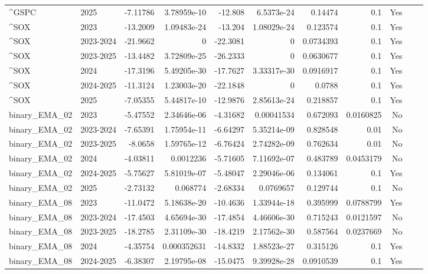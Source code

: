 \begin{longtable}{llrrrrrrrrl}
\textasciicircum{}GSPC & 2025 & -7.11786 & 3.78959e-10 & -12.808 & 6.5373e-24 & 0.14474 & 0.1 & Yes &  \\
\textasciicircum{}SOX & 2023 & -13.2009 & 1.09483e-24 & -13.204 & 1.08029e-24 & 0.123574 & 0.1 & Yes &  \\
\textasciicircum{}SOX & 2023-2024 & -21.9662 & 0 & -22.3081 & 0 & 0.0734393 & 0.1 & Yes &  \\
\textasciicircum{}SOX & 2023-2025 & -13.4482 & 3.72809e-25 & -26.2333 & 0 & 0.0630677 & 0.1 & Yes &  \\
\textasciicircum{}SOX & 2024 & -17.3196 & 5.49205e-30 & -17.7627 & 3.33317e-30 & 0.0916917 & 0.1 & Yes &  \\
\textasciicircum{}SOX & 2024-2025 & -11.3124 & 1.23003e-20 & -22.1848 & 0 & 0.0788 & 0.1 & Yes &  \\
\textasciicircum{}SOX & 2025 & -7.05355 & 5.44817e-10 & -12.9876 & 2.85613e-24 & 0.218857 & 0.1 & Yes &  \\
binary\_EMA\_02 & 2023 & -5.47552 & 2.34646e-06 & -4.31682 & 0.00041534 & 0.672093 & 0.0160825 & No &  \\
binary\_EMA\_02 & 2023-2024 & -7.65391 & 1.75954e-11 & -6.64297 & 5.35214e-09 & 0.828548 & 0.01 & No &  \\
binary\_EMA\_02 & 2023-2025 & -8.0658 & 1.59765e-12 & -6.76424 & 2.74282e-09 & 0.762634 & 0.01 & No &  \\
binary\_EMA\_02 & 2024 & -4.03811 & 0.0012236 & -5.71605 & 7.11692e-07 & 0.483789 & 0.0453179 & No &  \\
binary\_EMA\_02 & 2024-2025 & -5.75627 & 5.81019e-07 & -5.48047 & 2.29046e-06 & 0.134061 & 0.1 & Yes &  \\
binary\_EMA\_02 & 2025 & -2.73132 & 0.068774 & -2.68334 & 0.0769657 & 0.129744 & 0.1 & No &  \\
binary\_EMA\_08 & 2023 & -11.0472 & 5.18638e-20 & -10.4636 & 1.33944e-18 & 0.395999 & 0.0788799 & Yes &  \\
binary\_EMA\_08 & 2023-2024 & -17.4503 & 4.65694e-30 & -17.4854 & 4.46606e-30 & 0.715243 & 0.0121597 & No &  \\
binary\_EMA\_08 & 2023-2025 & -18.2785 & 2.31109e-30 & -18.4219 & 2.17562e-30 & 0.587564 & 0.0237669 & No &  \\
binary\_EMA\_08 & 2024 & -4.35754 & 0.000352631 & -14.8332 & 1.88523e-27 & 0.315126 & 0.1 & Yes &  \\
binary\_EMA\_08 & 2024-2025 & -6.38307 & 2.19795e-08 & -15.0475 & 9.39928e-28 & 0.0910539 & 0.1 & Yes &  \\

\end{longtable}
